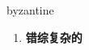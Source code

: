 
\begin{frame}
{\huge byzantine}
\begin{center}
\begin{enumerate}\Large
  \item \textbf{错综复杂的}
\end{enumerate}
\end{center}
\end{frame}
